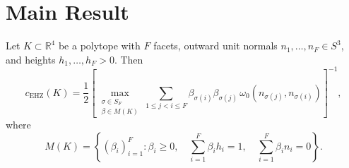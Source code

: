 %
%

\section{Main Result}\label{sec:main-result}


\begin{theorem}\label{thm:main}
Let $K \subset \mathbb{R}^4$ be a polytope
with $F$ facets, outward unit normals $n_1, \ldots, n_F \in S^3$,
and heights $h_1, \ldots, h_F > 0$.
Then
\begin{equation}\label{eq:ehz-main}
  c_{\mathrm{EHZ}}(K) = \frac{1}{2}
  \left[
    \max_{\substack{
      \sigma \in S_F \\
      \beta \in M(K)
    }}
    \sum_{1 \leq j < i \leq F}
      \beta_{\sigma(i)} \beta_{\sigma(j)} \,
      \omega_0(n_{\sigma(j)}, n_{\sigma(i)})
  \right]^{-1},
\end{equation}
where
\begin{equation}\label{eq:constraint-set}
  M(K) = \left\{
    (\beta_i)_{i=1}^{F} :
    \beta_i \geq 0, \quad  %
    \sum_{i=1}^{F} \beta_i h_i = 1, \quad
    \sum_{i=1}^{F} \beta_i n_i = 0
  \right\}.
\end{equation}
\end{theorem}


